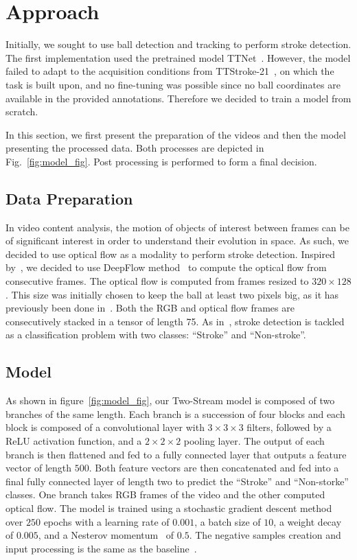 \documentclass[sigconf]{acmart-me}
\begin{document}
\section{Approach}
\label{sec:approach}
Initially, we sought to use ball detection and tracking to perform stroke detection. The first implementation used the pretrained model TTNet~\cite{voeikov2020ttnet}. However, the model failed to adapt to the acquisition conditions from TTStroke-21~\cite{PeCBMI:2018}, on which the task is built upon, and no fine-tuning was possible since no ball coordinates are available in the provided annotations. Therefore we decided to train a model from scratch.
\par
In this section, we first present the preparation of the videos and then the model presenting the processed data. Both processes are depicted in Fig.~\ref{fig:model_fig}. Post processing is performed to form a final decision.


\subsection{Data Preparation}

In video content analysis, the motion of objects of interest between frames can be of significant interest in order to understand their evolution in space. As such, we decided to use optical flow as a modality to perform stroke detection. Inspired by~\cite{PeICIP19}, we decided to use DeepFlow method~\cite{deepflow} to compute the optical flow from consecutive frames. The optical flow is computed from frames resized to $320\times128$. This size was initially chosen to keep the ball at least two pixels big, as it has previously been done in~\cite{voeikov2020ttnet}. Both the RGB and optical flow frames are consecutively stacked in a tensor of length 75. As in~\cite{mediaeval/Martin21/baseline}, stroke detection is tackled as a classification problem with two classes: ``Stroke'' and ``Non-stroke''.


\subsection{Model}

As shown in figure~\ref{fig:model_fig}, our Two-Stream model is composed of two branches of the same length. Each branch is a succession of four blocks and each block is composed of a convolutional layer with $3\times3\times3$ filters, followed by a ReLU activation function, and a $2\times2\times2$ pooling layer. The output of each branch is then flattened and fed to a fully connected layer that outputs a feature vector of length $500$. Both feature vectors are then concatenated and fed into a final fully connected layer of length two to predict the ``Stroke'' and ``Non-storke'' classes. One branch takes RGB frames of the video and the other computed optical flow. The model is trained using a stochastic gradient descent method over $250$ epochs with a learning rate of $0.001$, a batch size of $10$, a weight decay of $0.005$, and a Nesterov momentum~\cite{sutskever2013importance} of $0.5$. The negative samples creation and input processing is the same as the baseline~\cite{mediaeval/Martin21/baseline}.
\end{document}
